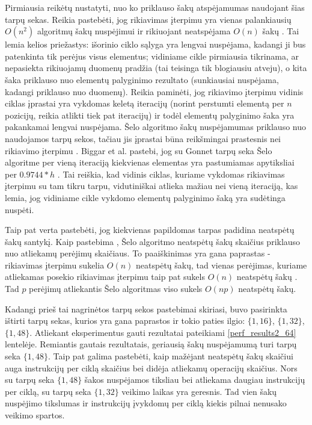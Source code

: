 \documentclass{VUMIFInfBakalaurinis}
\begin{document}
Pirmiausia reikėtų nustatyti, nuo ko priklauso šakų atspėjamumas naudojant šias tarpų sekas.
Reikia pastebėti, jog rikiavimas įterpimu yra vienas palankiausių $O(n^2)$ algoritmų šakų nuspėjimui
ir rikiuojant neatspėjama $O(n)$ šakų \cite{biggar2005sorting}.
Tai lemia kelios priežastys: išorinio ciklo sąlyga yra lengvai nuspėjama, kadangi ji bus patenkinta tik perėjus visus elementus;
vidiniame cikle pirmiausia tikrinama, ar nepasiekta rikiuojamų duomenų pradžia (tai teisinga tik blogiausiu atveju),
o kita šaka priklauso nuo elementų palyginimo rezultato (sunkiausiai nuspėjama, kadangi priklauso nuo duomenų).
Reikia paminėti, jog rikiavimo įterpimu vidinis ciklas įprastai yra vykdomas keletą iteracijų (norint perstumti elementą per $n$ pozicijų, reikia atlikti tiek pat iteracijų)
ir todėl elementų palyginimo šaka yra pakankamai lengvai nuspėjama.
Šelo algoritmo šakų nuspėjamumas priklauso nuo naudojamos tarpų sekos, tačiau jis įprastai būna reikšmingai prastesnis nei rikiavimo įterpimu \cite{biggar2005sorting}.
Biggar et al. pastebi, jog su Gonnet tarpų seka Šelo algoritme per vieną iteraciją kiekvienas elementas yra pastumiamas apytiksliai per $0.9744 * h$ \cite{biggar2008experimental}.
Tai reiškia, kad vidinis ciklas, kuriame vykdomas rikiavimas įterpimu su tam tikru tarpu, vidutiniškai atlieka mažiau nei vieną iteraciją, kas lemia, jog
vidiniame cikle vykdomo elementų palyginimo šaką yra sudėtinga nuspėti.

Taip pat verta pastebėti, jog kiekvienas papildomas tarpas padidina neatspėtų šakų santykį.
Kaip pastebima \cite{biggar2008experimental}, Šelo algoritmo neatspėtų šakų skaičius priklauso nuo atliekamų perėjimų skaičiaus.
To paaiškinimas yra gana paprastas - rikiavimas įterpimu sukelia $O(n)$ neatspėtų šakų,
tad vienas perėjimas, kuriame atliekamas posekio rikiavimas įterpimu taip pat sukels $O(n)$ neatspėtų šakų \cite{biggar2008experimental}.
Tad $p$ perėjimų atliekantis Šelo algoritmas viso sukels $O(np)$ neatspėtų šakų.

Kadangi prieš tai nagrinėtos tarpų sekos pastebimai skiriasi, buvo pasirinkta ištirti tarpų sekas, kurios yra gana paprastos ir tokio paties ilgio: $\{1, 16 \}$, $\{1, 32 \}$, $\{1, 48 \}$.
Atliekant eksperimentus gauti rezultatai pateikiami \ref{perf_results2_64} lentelėje.
Remiantis gautais rezultatais, geriausią šakų nuspėjamumą turi tarpų seka $\{1, 48 \}$.
Taip pat galima pastebėti, kaip mažėjant neatspėtų šakų skaičiui auga instrukcijų per ciklą skaičius bei didėja atliekamų operacijų skaičius.
Nors su tarpų seka $\{1, 48 \}$ šakos nuspėjamos tiksliau bei atliekama daugiau instrukcijų per ciklą, su tarpų seka $\{1, 32 \}$ veikimo laikas yra geresnis.
Tad vien šakų nuspėjimo tikslumas ir instrukcijų įvykdomų per ciklą kiekis pilnai nenusako veikimo spartos. 
\end{document}
